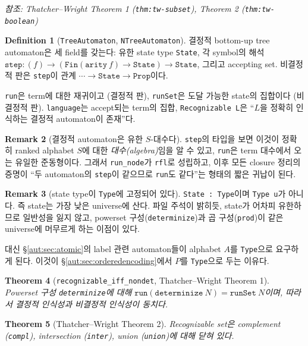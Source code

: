 \documentclass[11pt]{article}
\theoremstyle{definition}
\newtheorem{definition}{Definition}[section]
\newtheorem{remark}[definition]{Remark}
\theoremstyle{plain}
\newtheorem{theorem}[definition]{Theorem}
\newcommand{\lean}[1]{\texttt{#1}}
\newcommand{\TW}{Thatcher--Wright}
\begin{document}
\emph{참조: \TW{} Theorem 1 (\lean{thm:tw-subset}), Theorem 2
(\lean{thm:tw-boolean})}

\begin{definition}[\lean{TreeAutomaton}, \lean{NTreeAutomaton}]
\label{aut:def:automaton}
결정적 bottom-up tree automaton은 세 field를 갖는다: 유한 state type
\lean{State}, 각 symbol의 해석
$\lean{step} : (f) \to (\lean{Fin}(\lean{arity}\ f) \to \lean{State}) \to \lean{State}$,
그리고 accepting set. 비결정적 판은 \lean{step}이 관계
$\cdots \to \lean{State} \to \lean{Prop}$이다.

\lean{run}은 term에 대한 재귀이고 (결정적 판), \lean{runSet}은 도달 가능한
state의 집합이다 (비결정적 판). \lean{language}는 accept되는 term의 집합,
\lean{Recognizable L}은 ``$L$을 정확히 인식하는 결정적 automaton이 존재''다.
\end{definition}

\begin{remark}[결정적 automaton은 유한 $S$-대수다]
\lean{step}의 타입을 보면 이것이 정확히 ranked alphabet $S$에 대한
\emph{대수(algebra)}임을 알 수 있고, \lean{run}은 term 대수에서 오는 유일한
준동형이다. 그래서 \lean{run\_node}가 \lean{rfl}로 성립하고, 이후 모든
closure 정리의 증명이 ``두 automaton의 \lean{step}이 같으므로 \lean{run}도
같다''는 형태의 짧은 귀납이 된다.
\end{remark}

\begin{remark}[state type이 \lean{Type}에 고정되어 있다]
\label{aut:rem:universe}
\lean{State : Type}이며 \lean{Type u}가 아니다. 즉 state는 가장 낮은 universe에
산다. 파일 주석이 밝히듯, state가 어차피 유한하므로 일반성을 잃지 않고,
powerset 구성(\lean{determinize})과 곱 구성(\lean{prod})이 같은 universe에
머무르게 하는 이점이 있다.

대신 \S\ref{aut:sec:atomic}의 label 관련 automaton들이 alphabet $A$를
\lean{Type}으로 요구하게 된다. 이것이 \S\ref{aut:sec:orderedencoding}에서
$P$를 \lean{Type}으로 두는 이유다.
\end{remark}

\begin{theorem}[\lean{recognizable\_iff\_nondet}, \TW{} Theorem 1]
\label{aut:thm:subset}
Powerset 구성 \lean{determinize}에 대해
$\lean{run}(\lean{determinize}\ N) = \lean{runSet}\ N$이며, 따라서 결정적
인식성과 비결정적 인식성이 동치다.
\end{theorem}

\begin{theorem}[\TW{} Theorem 2]
\label{aut:thm:boolean}
Recognizable set은 complement (\lean{compl}), intersection (\lean{inter}),
union (\lean{union})에 대해 닫혀 있다.
\end{theorem}
\end{document}
